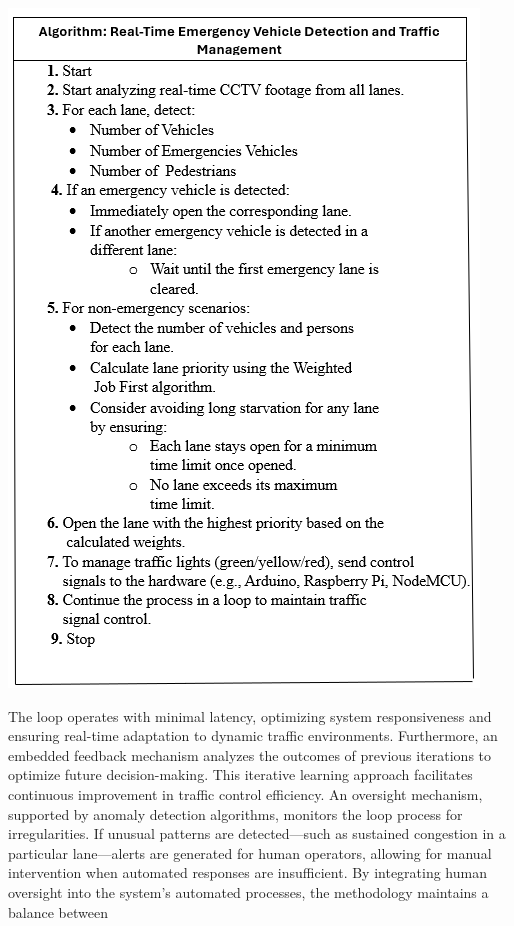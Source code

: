 \documentclass[usenatbib]{tjaa}
\begin{document}
\begin{minipage}{0.5\textwidth}
    \centering
    \includegraphics[width=\textwidth]{10.png} %
    \vspace{0.3cm}
\end{minipage}%

The loop operates with minimal latency, optimizing system responsiveness and ensuring real-time adaptation to dynamic traffic environments. Furthermore, an embedded feedback mechanism analyzes the outcomes of previous iterations to optimize future decision-making. This iterative learning approach facilitates continuous improvement in traffic control efficiency. An oversight mechanism, supported by anomaly detection algorithms, monitors the loop process for irregularities. If unusual patterns are detected—such as sustained congestion in a particular lane—alerts are generated for human operators, allowing for manual intervention when automated responses are insufficient. By integrating human oversight into the system's automated processes, the methodology maintains a balance between
\end{document}
